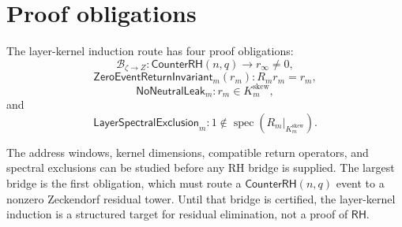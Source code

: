 \section{Proof obligations}
\label{sec:axiszeckendorf-layer-kernel-proof-obligations}

\begin{definition}
\label{def:axiszeckendorf-projection-tower-proof-obligations}
The layer-kernel induction route has four proof obligations:
$$
\mathcal B_{\zeta\to Z}:
\mathsf{CounterRH}(n,q)\to r_\infty\neq0,
$$
$$
\mathsf{ZeroEventReturnInvariant}_m(r_m):
R_mr_m=r_m,
$$
$$
\mathsf{NoNeutralLeak}_m:
r_m\in K_m^{\mathrm{skew}},
$$
and
$$
\mathsf{LayerSpectralExclusion}_m:
1\notin\operatorname{spec}(R_m|_{K_m^{\mathrm{skew}}}).
$$
\end{definition}

\begin{remark}
\label{rem:axiszeckendorf-independent-work-before-rh-bridge}
The address windows, kernel dimensions, compatible return operators, and
spectral exclusions can be studied before any RH bridge is supplied.  The
largest bridge is the first obligation, which must route a
$\mathsf{CounterRH}(n,q)$ event to a nonzero Zeckendorf residual tower.
Until that bridge is certified, the layer-kernel induction is a structured
target for residual elimination, not a proof of $\mathsf{RH}$.
\end{remark}

